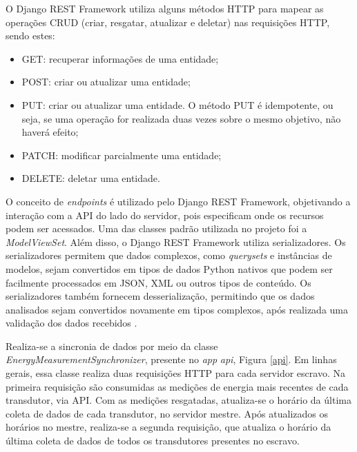 O Django REST Framework utiliza alguns métodos HTTP para mapear as operações CRUD (criar, resgatar, atualizar e deletar) nas requisições HTTP, sendo estes:

\begin{itemize}
    \item GET: recuperar informações de uma entidade;
    \item POST: criar ou atualizar uma entidade;
    \item PUT: criar ou atualizar uma entidade. O método PUT é idempotente, ou seja, se uma operação for realizada duas vezes sobre o mesmo objetivo, não haverá efeito;
    \item PATCH: modificar parcialmente uma entidade;
    \item DELETE: deletar uma entidade.
\end{itemize}

O conceito de \textit{endpoints} é utilizado pelo Django REST Framework, objetivando a interação com a API do lado do servidor, pois especificam onde os recursos podem ser acessados. Uma das classes padrão utilizada no projeto foi a \textit{ModelViewSet}. Além disso, o Django REST Framework utiliza serializadores. Os serializadores permitem que dados complexos, como \textit{querysets} e instâncias de modelos, sejam convertidos em tipos de dados Python nativos que podem ser facilmente processados em JSON, XML ou outros tipos de conteúdo. Os serializadores também fornecem desserialização, permitindo que os dados analisados sejam convertidos novamente em tipos complexos, após realizada uma validação dos dados recebidos \cite{django_rest}.

Realiza-se a sincronia de dados por meio da classe \textit{EnergyMeasurementSynchronizer}, presente no \textit{app} \textit{api}, Figura \ref{api}. Em linhas gerais, essa classe realiza duas requisições HTTP para cada servidor escravo. Na primeira requisição são consumidas as medições de energia mais recentes de cada transdutor, via API. Com as medições resgatadas, atualiza-se o horário da última coleta de dados de cada transdutor, no servidor mestre. Após atualizados os horários no mestre, realiza-se a segunda requisição, que atualiza o horário da última coleta de dados de todos os transdutores presentes no escravo.

